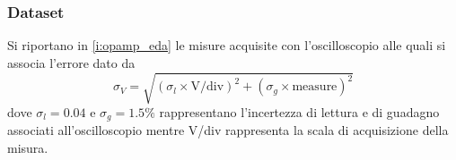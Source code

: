 \documentclass[a4paper,11pt]{article} %
\begin{document}
\subsubsection{Dataset}
Si riportano in  \autoref{i:opamp_eda} le misure acquisite con l'oscilloscopio alle quali si associa l'errore dato da
\begin{equation}\label{e:osc}
	\sigma_{V} = \sqrt{ (\sigma_{l}\times\text{V/div})^2 + (\sigma_{g}\times\text{measure})^2 }
\end{equation}
\noindent dove $\sigma_{l}=0.04$ e $\sigma_{g}=1.5\%$ rappresentano l'incertezza di lettura e di guadagno associati
all'oscilloscopio mentre V/div rappresenta la scala di acquisizione della misura.

%
%		
%
%
%		
%		
%		
%		
%	
%
%		
%
%		
%
%
\end{document}
